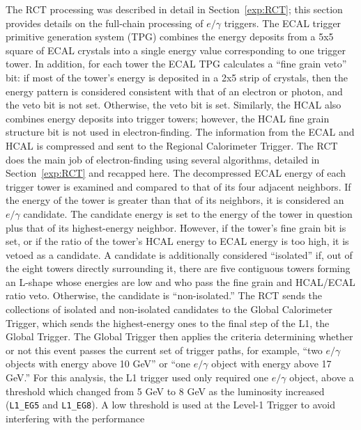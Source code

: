 The RCT processing was described in detail in 
Section~\ref{exp:RCT}; 
this section provides details on the full-chain processing of $e/\gamma$ triggers.  
The ECAL trigger primitive generation system (TPG) combines the energy deposits 
from a 5x5 square of ECAL crystals into a single energy value corresponding to 
one trigger tower. %
In addition, for each tower the ECAL TPG calculates a ``fine grain veto'' bit: 
if most of the tower's energy is deposited in a 2x5 strip of crystals, 
then the energy pattern is considered consistent with that of an electron
or photon, 
and the veto bit is not set.  
Otherwise, the veto bit is set.  
Similarly, the HCAL also combines energy deposits into trigger towers; 
however, the HCAL fine grain structure bit is not used in electron-finding.  
The information from the ECAL and HCAL is compressed and sent to the 
Regional Calorimeter Trigger.  
The RCT does the main job of electron-finding using several algorithms, 
detailed in Section~\ref{exp:RCT} and recapped here.  
The decompressed ECAL energy of each trigger tower is examined and 
compared to that of its four adjacent neighbors.  
If the energy of the tower is greater than that of its neighbors, 
it is considered an $e/\gamma$ candidate.  
The candidate energy is set to the energy of the tower in question 
plus that of its highest-energy neighbor.  
However, if the tower's fine grain bit is set, 
or if the ratio of the tower's HCAL energy to ECAL energy is too high, 
it is vetoed as a candidate.  
A candidate is additionally considered ``isolated'' if, 
out of the eight towers directly surrounding it, 
there are five contiguous towers forming an L-shape whose 
energies are low and who pass the fine grain and HCAL/ECAL ratio veto.  
Otherwise, the candidate is ``non-isolated.''  
The RCT sends the collections of isolated and non-isolated candidates to the 
Global Calorimeter Trigger, 
which sends the highest-energy ones to the final step of the L1, the Global Trigger.  
The Global Trigger then applies the criteria determining whether or not 
this event passes the current set of trigger paths,
for example, ``two $e/\gamma$ objects with energy above 10 GeV'' 
or ``one $e/\gamma$ object with energy above 17 GeV.''  
For this analysis, the L1 trigger used only required one $e/\gamma$ 
object, above a threshold which changed from 5 GeV to 8 GeV 
as the luminosity increased (\texttt{L1\_EG5} and \texttt{L1\_EG8}).  
A low threshold is used at the Level-1 Trigger 
to avoid interfering with the performance 
